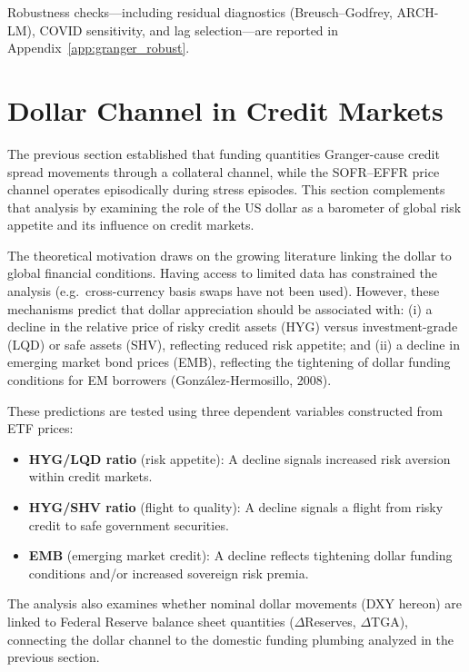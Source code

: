 \documentclass[12pt,a4paper]{article}
\begin{document}
Robustness checks---including residual diagnostics (Breusch--Godfrey, ARCH-LM), COVID sensitivity, and lag selection---are reported in Appendix~\ref{app:granger_robust}.


\section{Dollar Channel in Credit Markets}
\label{sec:dollar}

The previous section established that funding quantities Granger-cause credit spread movements through a collateral channel, while the SOFR--EFFR price channel operates episodically during stress episodes. This section complements that analysis by examining the role of the US dollar as a barometer of global risk appetite and its influence on credit markets.

The theoretical motivation draws on the growing literature linking the dollar to global financial conditions. Having access to limited data has constrained the analysis (e.g.\ cross-currency basis swaps have not been used). However, these mechanisms predict that dollar appreciation should be associated with: (i) a decline in the relative price of risky credit assets (HYG) versus investment-grade (LQD) or safe assets (SHV), reflecting reduced risk appetite; and (ii) a decline in emerging market bond prices (EMB), reflecting the tightening of dollar funding conditions for EM borrowers (Gonz\'alez-Hermosillo, 2008).

These predictions are tested using three dependent variables constructed from ETF prices:

\begin{itemize}
  \item \textbf{HYG/LQD ratio} (risk appetite): A decline signals increased risk aversion within credit markets.
  \item \textbf{HYG/SHV ratio} (flight to quality): A decline signals a flight from risky credit to safe government securities.
  \item \textbf{EMB} (emerging market credit): A decline reflects tightening dollar funding conditions and/or increased sovereign risk premia.
\end{itemize}

The analysis also examines whether nominal dollar movements (DXY hereon) are linked to Federal Reserve balance sheet quantities ($\Delta$Reserves, $\Delta$TGA), connecting the dollar channel to the domestic funding plumbing analyzed in the previous section.
\end{document}
